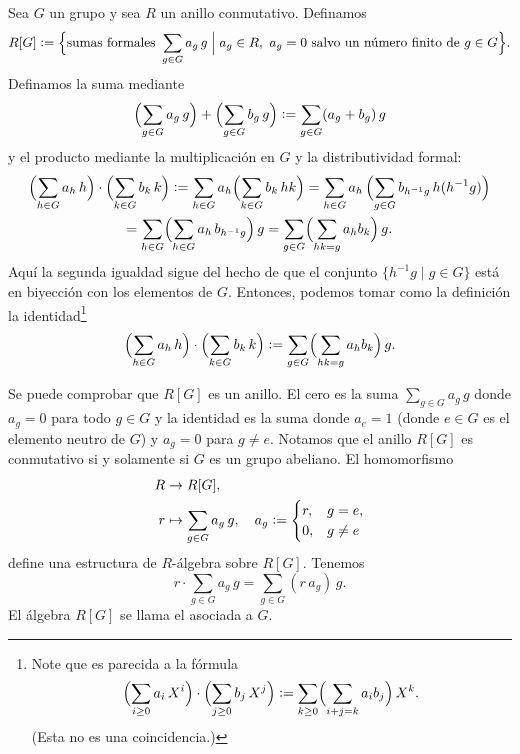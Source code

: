 \begin{definicion}
  Sea $G$ un grupo y sea $R$ un anillo
  conmutativo. Definamos
  \[ R [G] \mathrel{\mathop:}=
     \Bigl\{ \text{sumas formales }\sum_{g\in G} a_g\,g \Bigm|
             a_g\in R, ~ a_g = 0
             \text{ salvo un número finito de }g\in G \Bigr\}. \]
  Definamos la suma mediante
  \[ \Bigl(\sum_{g\in G} a_g\,g\Bigr) + \Bigl(\sum_{g\in G} b_g\,g\Bigr) \mathrel{\mathop:}=
     \sum_{g\in G} (a_g+b_g)\,g \]
  y el producto mediante la multiplicación en $G$ y la distributividad formal:
  \begin{multline*}
    \Bigl(\sum_{h\in G} a_h\,h\Bigr) \cdot \Bigl(\sum_{k\in G} b_k\,k\Bigr) \mathrel{\mathop:}=
    \sum_{h\in G} a_h \Bigl( \sum_{k\in G} b_k\,hk\Bigr) =
    \sum_{h\in G} a_h \, \Bigl( \sum_{g\in G} b_{h^{-1}g}\,h (h^{-1} g)\Bigr) \\
    = \sum_{h\in G} \Bigl(\sum_{h\in G} a_h\,b_{h^{-1}g}\Bigr)\,g =
    \sum_{g\in G} \Bigl(\sum_{hk = g} a_h b_k\Bigr)\,g.
  \end{multline*}
  Aquí la segunda igualdad sigue del hecho de que el conjunto
  $\{ h^{-1} g \mid g\in G \}$ está en biyección con los elementos
  de $G$. Entonces, podemos tomar como la definición la
  identidad\footnote{Note que es parecida a la fórmula
    \[ \Bigl(\sum_{i\ge 0} a_i\,X^i\Bigr) \cdot
      \Bigl(\sum_{j \ge 0} b_j\,X^j\Bigr) \mathrel{\mathop:}=
      \sum_{k\ge 0} \Bigl(\sum_{i + j = k} a_i b_j\Bigr)\,X^k. \]
    (Esta no es una coincidencia.)}
  \[ \Bigl(\sum_{h\in G} a_h\,h\Bigr) \cdot \Bigl(\sum_{k\in G} b_k\,k\Bigr) \mathrel{\mathop:}=
     \sum_{g\in G} \Bigl(\sum_{hk = g} a_h b_k\Bigr)\,g. \]

  Se puede comprobar que $R [G]$ es un anillo. El cero es la suma
  $\sum_{g\in G} a_g\,g$ donde $a_g = 0$ para todo $g\in G$ y la identidad
  es la suma donde $a_e = 1$ (donde $e\in G$ es el elemento neutro de $G$)
  y $a_g = 0$ para $g\ne e$. Notamos que el anillo $R [G]$ es conmutativo
  si y solamente si $G$ es un grupo abeliano. El homomorfismo
  \begin{align*}
    R & \to R [G],\\
    r & \mapsto \sum_{g\in G} a_g\,g, \quad a_g \mathrel{\mathop:}= \begin{cases}
      r, & g = e,\\
      0, & g \ne e
    \end{cases}
  \end{align*}
  define una estructura de $R$-álgebra sobre $R [G]$. Tenemos
  $$r\cdot \sum_{g\in G} a_g\,g = \sum_{g\in G} (r\,a_g)\,g.$$
  El álgebra $R [G]$ se llama el 
  asociada a $G$.
\end{definicion}

